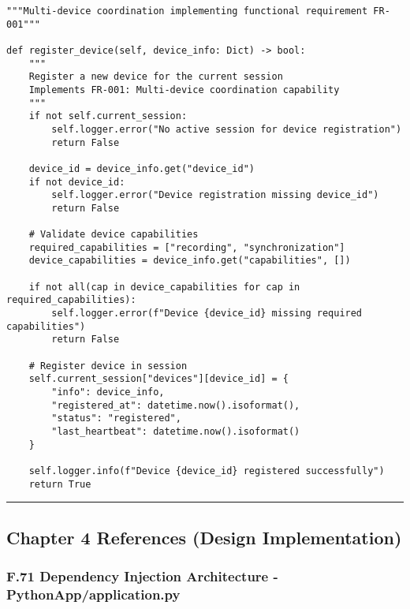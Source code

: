 \documentclass[12pt,a4paper]{article}
\begin{document}
\begin{verbatim}
"""Multi-device coordination implementing functional requirement FR-001"""

def register_device(self, device_info: Dict) -> bool:
    """
    Register a new device for the current session
    Implements FR-001: Multi-device coordination capability
    """
    if not self.current_session:
        self.logger.error("No active session for device registration")
        return False
    
    device_id = device_info.get("device_id")
    if not device_id:
        self.logger.error("Device registration missing device_id")
        return False
    
    # Validate device capabilities
    required_capabilities = ["recording", "synchronization"]
    device_capabilities = device_info.get("capabilities", [])
    
    if not all(cap in device_capabilities for cap in required_capabilities):
        self.logger.error(f"Device {device_id} missing required capabilities")
        return False
    
    # Register device in session
    self.current_session["devices"][device_id] = {
        "info": device_info,
        "registered_at": datetime.now().isoformat(),
        "status": "registered",
        "last_heartbeat": datetime.now().isoformat()
    }
    
    self.logger.info(f"Device {device_id} registered successfully")
    return True
\end{verbatim}

\hrule

\subsection{Chapter 4 References (Design Implementation)}

\subsubsection{F.71 Dependency Injection Architecture - PythonApp/application.py}
\end{document}
